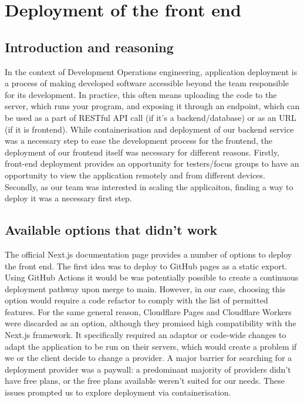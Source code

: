 \section{Deployment of the front end}

\subsection{Introduction and reasoning}
In the context of Development Operations engineering, application deployment is a process of making developed software accessible beyond the team responsible for its development. In practice, this often means uploading the code to the server, which runs your program, and exposing it through an endpoint, which can be used as a part of RESTful API call (if it's a backend/database) or as an URL (if it is frontend). While containerisation and deployment of our backend service was a necessary step to ease the development process for the frontend, the deployment of our frontend itself was necessary for different reasons. Firstly, front-end deployment provides an opportunity for testers/focus groups to have an opportunity to view the application remotely and from different devices. Secondly, as our team was interested in scaling the applicaiton, finding a way to deploy it was a necessary first step.

\subsection{Available options that didn't work}
The official Next.js documentation page \cite{vercelMainDeploymentMainPage} provides a number of options to deploy the front end. The first idea was to deploy to GitHub pages as a static export. Using GitHub Actions it would be was potentially possible to create a continuous deployment pathway upon merge to main. However, in our case, choosing this option would require a code refactor to comply with the list of permitted features. For the same general reason, Cloudflare Pages and Cloudflare Workers \cite{cloudflare_pages_workers} were discarded as an option, although they promised high compatibility with the Next.js framework.
 It specifically required an adaptor or code-wide changes to adapt the application to be run on their servers, which would create a problem if we or the client decide to change a provider. A major barrier for searching for a deployment provider was a paywall: a predominant majority of providers didn't have free plans, or the free plans available weren't suited for our needs. These issues prompted us to explore deployment via containerisation. 

